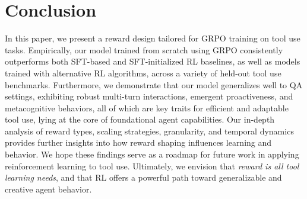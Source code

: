 \section{Conclusion}
In this paper, we present a reward design tailored for GRPO training on tool use tasks. Empirically, our model trained from scratch using GRPO consistently outperforms both SFT-based and SFT-initialized RL baselines, as well as models trained with alternative RL algorithms, across a variety of held-out tool use benchmarks. Furthermore, we demonstrate that our model generalizes well to QA settings, exhibiting robust multi-turn interactions, emergent proactiveness, and metacognitive behaviors, all of which are key traits for efficient and adaptable tool use, lying at the core of foundational agent capabilities.
Our in-depth analysis of reward types, scaling strategies, granularity, and temporal dynamics provides further insights into how reward shaping influences learning and behavior. We hope these findings serve as a roadmap for future work in applying reinforcement learning to tool use. Ultimately, we envision that \textit{reward is all tool learning needs}, and that RL offers a powerful path toward generalizable and creative agent behavior.



